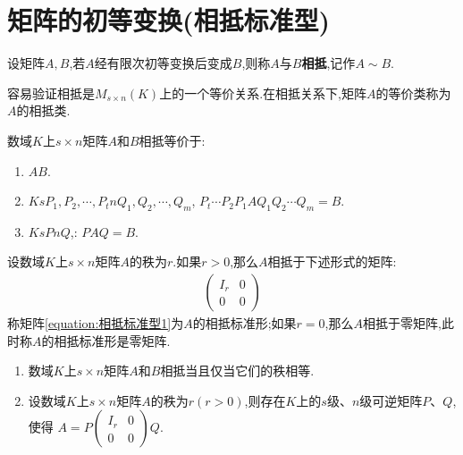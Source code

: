 \documentclass[../../main.tex]{subfiles}%
\begin{document}
\section{矩阵的初等变换(相抵标准型)}


\begin{definition}[矩阵相抵的定义]\label{definition:矩阵相抵的定义}
设矩阵$A,B$,若$A$经有限次初等变换后变成$B$,则称$A$与$B$\textbf{相抵},记作$A\sim B$.
\end{definition}
\begin{note}
容易验证相抵是\(M_{s\times n}(K)\)上的一个等价关系.在相抵关系下,矩阵\(A\)的等价类称为\(A\)的相抵类.
\end{note}

\begin{proposition}[矩阵相抵的等价命题]\label{proposition:矩阵相抵的等价命题}
数域\(K\)上\(s\times n\)矩阵\(A\)和\(B\)相抵等价于:
\begin{enumerate}
\item $A$\(B\).

\item {}$K$$s$$P_1,P_2,\cdots,P_t$$n$$Q_1,Q_2,\cdots,Q_m$,
$P_t\cdots P_2P_1AQ_1Q_2\cdots Q_m = B$.

\item {}\(K\)\(s\)\(P\)\(n\)\(Q\),:
\(PAQ = B\).
\end{enumerate}
\end{proposition}

\begin{theorem}[相抵标准型]\label{theorem:相抵标准型}
设数域\(K\)上\(s\times n\)矩阵\(A\)的秩为\(r\).如果\(r > 0\),那么\(A\)相抵于下述形式的矩阵:
\begin{align}\label{equation:相抵标准型1}
\begin{pmatrix}
I_r & 0 \\
0 & 0
\end{pmatrix}   
\end{align}
称矩阵\eqref{equation:相抵标准型1}为\(A\)的相抵标准形;如果\(r = 0\),那么\(A\)相抵于零矩阵,此时称\(A\)的相抵标准形是零矩阵.
\end{theorem}

\begin{corollary}
\begin{enumerate}
\item 数域\(K\)上\(s\times n\)矩阵\(A\)和\(B\)相抵当且仅当它们的秩相等.

\item 设数域\(K\)上\(s\times n\)矩阵\(A\)的秩为\(r(r > 0)\),则存在\(K\)上的\(s\)级、\(n\)级可逆矩阵\(P\)、\(Q\),使得
\(A = P\begin{pmatrix}
I_r & 0 \\
0 & 0
\end{pmatrix}Q\).
\end{enumerate}
\end{corollary}
\end{document}
